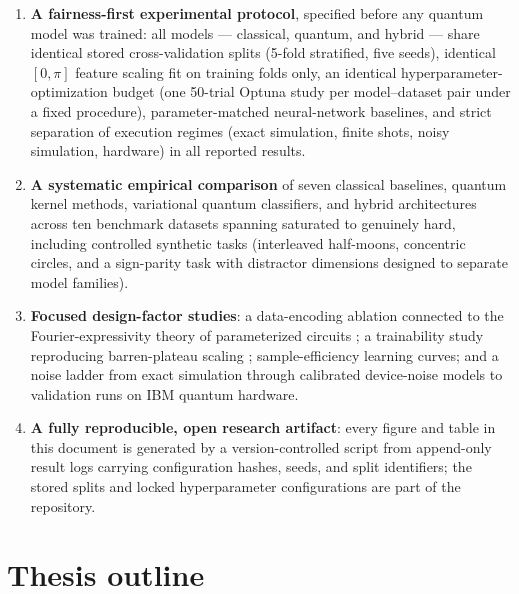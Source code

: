 \begin{enumerate}
  \item \textbf{A fairness-first experimental protocol}, specified before any
  quantum model was trained: all models --- classical, quantum, and hybrid ---
  share identical stored cross-validation splits (5-fold stratified, five
  seeds), identical $[0,\pi]$ feature scaling fit on training folds only,
  an identical hyperparameter-optimization budget (one 50-trial Optuna study
  per model--dataset pair under a fixed procedure), parameter-matched
  neural-network baselines, and strict separation of execution regimes (exact
  simulation, finite shots, noisy simulation, hardware) in all reported
  results.

  \item \textbf{A systematic empirical comparison} of seven classical
  baselines, quantum kernel methods, variational quantum classifiers, and
  hybrid architectures across ten benchmark datasets spanning saturated to
  genuinely hard, including controlled synthetic tasks (interleaved half-moons,
  concentric circles, and a sign-parity task with distractor dimensions
  designed to separate model families).

  \item \textbf{Focused design-factor studies}: a data-encoding ablation
  connected to the Fourier-expressivity theory of parameterized circuits
  \citep{schuld2021fourier}; a trainability study reproducing barren-plateau
  scaling \citep{mcclean2018barren}; sample-efficiency learning curves; and a
  noise ladder from exact simulation through calibrated device-noise models to
  validation runs on IBM quantum hardware.

  \item \textbf{A fully reproducible, open research artifact}: every figure and
  table in this document is generated by a version-controlled script from
  append-only result logs carrying configuration hashes, seeds, and split
  identifiers; the stored splits and locked hyperparameter configurations are
  part of the repository.
\end{enumerate}

\section{Thesis outline}
\label{sec:intro-outline}

